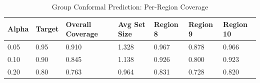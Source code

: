 \begin{table}[ht]
\caption{Group Conformal Prediction: Per-Region Coverage}
\centering
\begin{tabular}{lllllll}
\hline
Alpha & Target & Overall Coverage & Avg Set Size & Region 8 & Region 9 & Region 10 \\
\hline
0.05 & 0.95 & 0.910 & 1.328 & 0.967 & 0.878 & 0.966 \\
0.10 & 0.90 & 0.845 & 1.138 & 0.926 & 0.800 & 0.923 \\
0.20 & 0.80 & 0.763 & 0.964 & 0.831 & 0.728 & 0.820 \\
\hline
\end{tabular}
\end{table}
